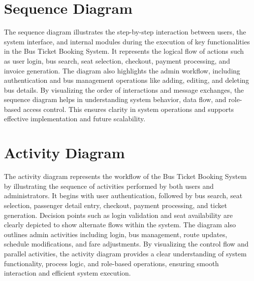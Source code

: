 
\section{Sequence Diagram}

The sequence diagram illustrates the step-by-step interaction between users, the system interface, and internal modules during the execution of key functionalities in the Bus Ticket Booking System. It represents the logical flow of actions such as user login, bus search, seat selection, checkout, payment processing, and invoice generation. The diagram also highlights the admin workflow, including authentication and bus management operations like adding, editing, and deleting bus details. By visualizing the order of interactions and message exchanges, the sequence diagram helps in understanding system behavior, data flow, and role-based access control. This ensures clarity in system operations and supports effective implementation and future scalability.


\section{Activity Diagram}

The activity diagram represents the workflow of the Bus Ticket Booking System by illustrating the sequence of activities performed by both users and administrators. It begins with user authentication, followed by bus search, seat selection, passenger detail entry, checkout, payment processing, and ticket generation. Decision points such as login validation and seat availability are clearly depicted to show alternate flows within the system. The diagram also outlines admin activities including login, bus management, route updates, schedule modifications, and fare adjustments. By visualizing the control flow and parallel activities, the activity diagram provides a clear understanding of system functionality, process logic, and role-based operations, ensuring smooth interaction and efficient system execution.

